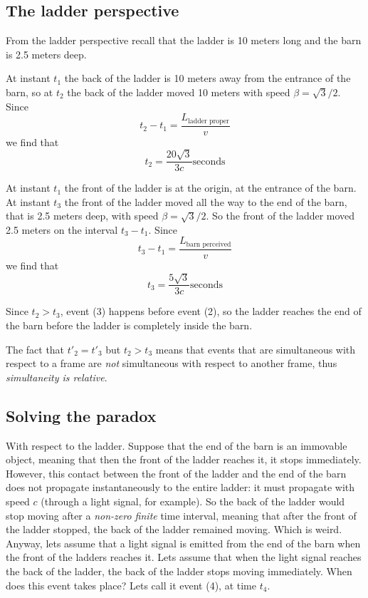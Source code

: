 \documentclass[oneside, 10pt, notitlepage]{book}
\begin{document}
\subsection{The ladder perspective}

From the ladder perspective recall that the ladder is 10 meters long and the barn is 2.5 meters deep.  

At instant \(t_1\) the back of the ladder is 10 meters away from the entrance of the barn, so at \(t_2\) the back of the ladder moved 10 meters with speed \(\beta = \sqrt{3}/2\). Since
\begin{equation}t_2 - t_1 = \frac{L_{\text{ladder proper}}}{v}\end{equation}
we find that
\begin{equation}t_2 = \frac{20 \sqrt{3}}{3c} \text{seconds}\end{equation} 

At instant \(t_1\) the front of the ladder is at the origin, at the entrance of the barn. At instant \(t_3\) the front of the ladder moved all the way to the end of the barn, that is 2.5 meters deep, with speed \(\beta = \sqrt{3}/2\). So the front of the ladder moved 2.5 meters on the interval \(t_3 - t_1\). Since
\begin{equation}t_3 -t_1 = \frac{L_{\text{barn perceived}}}{v} \end{equation}
we find that
\begin{equation}t_3 = \frac{5 \sqrt{3}}{3c} \text{seconds}\end{equation} 

Since \(t_2 > t_3\), event (3) happens before event (2), so the ladder reaches the end of the barn before the ladder is completely inside the barn.  

The fact that \(t{\prime}_2 = t{\prime}_3\) but \(t_2 > t_3\) means that events that are simultaneous with respect to a frame are \emph{not} simultaneous with respect to another frame, thus \emph{simultaneity is relative}.

\subsection{Solving the paradox}

With respect to the ladder. Suppose that the end of the barn is an immovable object, meaning that then the front of the ladder reaches it, it stops immediately. However, this contact between the front of the ladder and the end of the barn does not propagate instantaneously to the entire ladder: it must propagate with speed \(c\) (through a light signal, for example). So the back of the ladder would stop moving after a \emph{non-zero finite} time interval, meaning that after the front of the ladder stopped, the back of the ladder remained moving. Which is weird. Anyway, lets assume that a light signal is emitted from the end of the barn when the front of the ladders reaches it. Lets assume that when the light signal reaches the back of the ladder, the back of the ladder stops moving immediately. When does this event takes place? Lets call it event (4), at time \(t_4\).  
\end{document}

